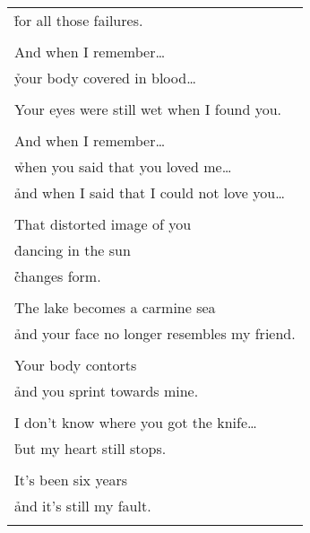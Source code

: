 \documentclass{article}
\begin{document}
\begin{center}
\begin{tabular}{l}
\h for all those failures. \\
\\
And when I remember\ldots{} \\
\h your body covered in blood\ldots{} \\
\\
Your eyes were still wet when I found you. \\
\\
And when I remember\ldots{} \\
\h when you said that you loved me\ldots{} \\
\h and when I said that I could not love you\ldots{} \\
\\
That distorted image of you \\
\h dancing in the sun \\
\h\h changes form. \\
\\
The lake becomes a carmine sea \\
\h and your face no longer resembles my friend. \\
\\
Your body contorts \\
\h and you sprint towards mine. \\
\\
I don't know where you got the knife\ldots{} \\
\h but my heart still stops. \\
\\
It's been six years \\
\h and it's still my fault. \\
\\
\end{tabular}
%
%
%
%
%

\end{center}
\end{document}
